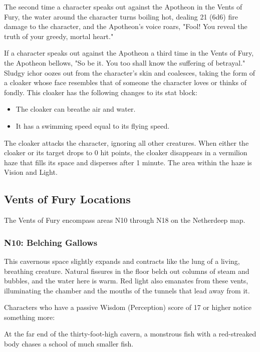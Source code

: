 \documentclass[10pt,a4paper,twoside,bg=print,twocolumn,openany,nodeprecatedcode]{dndbook}
\begin{document}
The second time a character speaks out against the Apotheon in the Vents of Fury, the water around the character turns boiling hot, dealing 21 (6d6) fire damage to the character, and the Apotheon's voice roars, "Fool! You reveal the truth of your greedy, mortal heart."

If a character speaks out against the Apotheon a third time in the Vents of Fury, the Apotheon bellows, "So be it. You too shall know the suffering of betrayal." Sludgy ichor oozes out from the character's skin and coalesces, taking the form of a cloaker whose face resembles that of someone the character loves or thinks of fondly. This cloaker has the following changes to its stat block:


\begin{itemize}
\item The cloaker can breathe air and water.
\item It has a swimming speed equal to its flying speed.
\end{itemize}

The cloaker attacks the character, ignoring all other creatures. When either the cloaker or its target drops to 0 hit points, the cloaker disappears in a vermilion haze that fills its space and disperses after 1 minute. The area within the haze is Vision and Light.

\subsection{Vents of Fury Locations}
The Vents of Fury encompass areas N10 through N18 on the Netherdeep map.

\subsubsection{N10: Belching Gallows}
\begin{DndReadAloud}{}
This cavernous space slightly expands and contracts like the lung of a living, breathing creature. Natural fissures in the floor belch out columns of steam and bubbles, and the water here is warm. Red light also emanates from these vents, illuminating the chamber and the mouths of the tunnels that lead away from it.

\end{DndReadAloud}

Characters who have a passive Wisdom (Perception) score of 17 or higher notice something more:

\begin{DndReadAloud}{}
At the far end of the thirty-foot-high cavern, a monstrous fish with a red-streaked body chases a school of much smaller fish.

\end{DndReadAloud}
\end{document}
